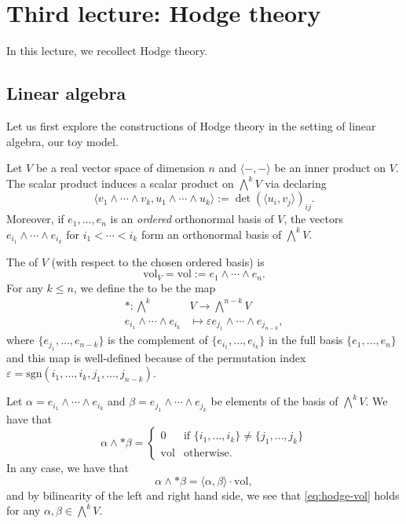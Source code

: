 
\section{Third lecture: Hodge theory}
In this lecture, we recollect Hodge theory.
%
\subsection{Linear algebra}
Let  us first explore the constructions of Hodge theory in the setting of linear algebra, our toy model.

Let $V$ be a real vector space of dimension $n$ and $\langle-,-\rangle$ be an inner product on $V$. The scalar product induces a scalar product on $\bigwedge^k V$ via declaring
\[
\langle v_1\wedge\cdots\wedge v_k,u_1\wedge\cdots\wedge u_k\rangle:=\det(\langle u_i,v_j\rangle)_{ij}.
\]
Moreover, if $e_1,\dots,e_n$ is an \emph{ordered} orthonormal basis of $V$, the vectors $e_{i_1}\wedge\cdots\wedge e_{i_k}$ for $i_1<\cdots<i_k$ form an orthonormal basis of $\bigwedge^kV$.
\begin{definition}
	The  of $V$ (with respect to the chosen ordered basis) is 
	\[
	\text{vol}_V=\text{vol}:=e_1\wedge\cdots\wedge e_n.
	\]
	For any $k\leq n$, we define the  to be the map
	\begin{align*}
		*:\bigwedge^k &V\to \bigwedge^{n-k}V\\
		e_{i_1}\wedge\cdots\wedge e_{i_k}&\mapsto \varepsilon e_{j_1}\wedge \cdots\wedge e_{j_{n-k}},
	\end{align*}
	where $\{e_{j_1},\dots,e_{n-k}\}$ is the complement of $\{e_{i_1},\dots,e_{i_k}\}$ in the full basis $\{e_1,\dots,e_n\}$ and this map is well-defined because of the permutation index $\varepsilon=\text{sgn}(i_1,\dots,i_k,j_1,\dots,j_{n-k})$.
\end{definition}

Let $\alpha=e_{i_1}\wedge\cdots\wedge e_{i_k}$ and $\beta=e_{j_1}\wedge\cdots\wedge e_{j_k}$ be elements of the basis of $\bigwedge^kV$. We have that
\[
\alpha\wedge *\beta=\begin{cases}
	0 & \text{if }\{i_1,\dots,i_k\}\neq \{j_1,\dots,j_k\}\\
	\text{vol}&\text{otherwise}.
\end{cases}
\]
In any case, we have that 
\begin{equation}
	\alpha\wedge *\beta=\langle\alpha,\beta\rangle\cdot\text{vol}\label{eq:hodge-vol},
	\end{equation}
and by bilinearity of the left and right hand side, we see that \eqref{eq:hodge-vol} holds for any $\alpha,\beta\in\bigwedge^kV$.

